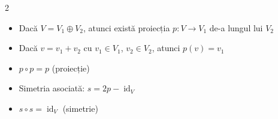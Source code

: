 \documentclass[10pt]{extarticle}
\begin{document}
\begin{multicols*}{2}
\begin{itemize}[leftmargin=*]
\begin{itemize}[leftmargin=*]
  \item Dacă $V = V_1 \oplus V_2$, atunci există proiecția $p : V \to V_1$ de-a lungul lui $V_2$
  \item Dacă $v = v_1 + v_2$ cu $v_1 \in V_1$, $v_2 \in V_2$, atunci $p(v) = v_1$
  \item $p \circ p = p$ (proiecție)
  \item Simetria asociată: $s = 2p - \operatorname{id}_V$
  \item $s \circ s = \operatorname{id}_V$ (simetrie)
\end{itemize}


  
\end{itemize}




\end{multicols*}
\end{document}
